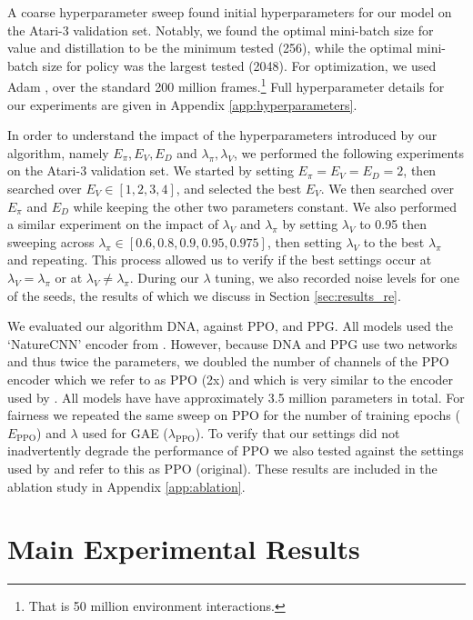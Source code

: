 \documentclass{article}
\begin{document}
A coarse hyperparameter sweep found initial hyperparameters for our model on the Atari-3 validation set. Notably, we found the optimal mini-batch size for value and distillation to be the minimum tested (256), while the optimal mini-batch size for policy was the largest tested (2048). For optimization, we used Adam \cite{kingma2014adam}, over the standard 200 million frames.\footnote{That is 50 million environment interactions.} Full hyperparameter details for our experiments are given in Appendix \ref{app:hyperparameters}.

In order to understand the impact of the hyperparameters introduced by our algorithm, namely $E_\pi, E_V, E_D$ and $\lambda_\pi, \lambda_V$, we performed the following experiments on the Atari-3 validation set. We started by setting $E_\pi = E_V = E_D = 2$, then searched over $E_V \in [1,2,3,4]$, and selected the best $E_V$. We then searched over $E_\pi$ and $E_D$ while keeping the other two parameters constant. We also performed a similar experiment on the impact of $\lambda_V$ and $\lambda_\pi$ by setting $\lambda_V$ to 0.95 then sweeping across $\lambda_\pi \in [0.6, 0.8, 0.9, 0.95, 0.975]$, then setting $\lambda_V$ to the best $\lambda_\pi$ and repeating. This process allowed us to verify if the best settings occur at $\lambda_V=\lambda_\pi$ or at $\lambda_V \neq \lambda_\pi$. During our $\lambda$ tuning, we also recorded noise levels for one of the seeds, the results of which we discuss in Section \ref{sec:results_re}.

We evaluated our algorithm DNA, against PPO, and PPG. All models used the `NatureCNN' encoder from \cite{mnih2015human}. However, because DNA and PPG use two networks and thus twice the parameters, we doubled the number of channels of the PPO encoder which we refer to as PPO (2x) and which is very similar to the encoder used by \cite{badia2020agent57}. All models have have approximately 3.5 million parameters in total. For fairness we repeated the same sweep on PPO for the number of training epochs ($E_\text{PPO}$) and $\lambda$ used for GAE ($\lambda_\text{PPO}$). To verify that our settings did not inadvertently degrade the performance of PPO we also tested against the settings used by \cite{schulman2017proximal} and refer to this as PPO (original). These results are included in the ablation study in Appendix \ref{app:ablation}.

\section{Main Experimental Results}
\label{sec:results}
\end{document}
